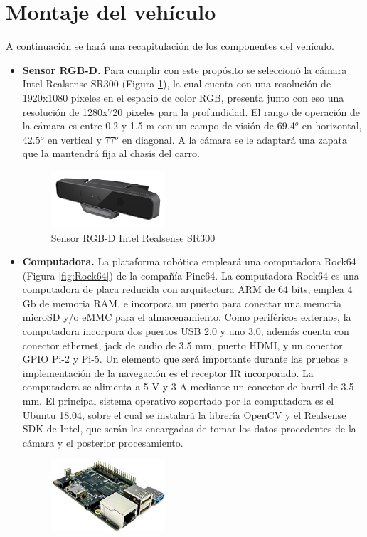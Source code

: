 \section{Montaje del vehículo}
\label{sec:monveh}
A continuación se hará una recapitulación de los componentes del vehículo.
\begin{itemize}
	\item {\bf Sensor RGB-D.} Para cumplir con este propósito se seleccionó la cámara Intel Realsense SR300 (Figura \ref{fig:SR300}), la cual cuenta con una resolución de 1920x1080 pixeles en el espacio de color RGB, presenta junto con eso una resolución de 1280x720 pixeles para la profundidad. El rango de operación de la cámara es entre 0.2 y 1.5 m con un campo de visión de 69.4$^o$ en horizontal, 42.5$^o$ en vertical y 77$^o$ en diagonal. A la cámara se le adaptará una zapata que la mantendrá fija al chasís del carro.
	\begin{figure}[htbp!]
		\centering
		\includegraphics[width=0.4\textwidth]{./Figuras/Intel}
		\caption{Sensor RGB-D Intel Realsense SR300}
		\label{fig:SR300}
	\end{figure}
	\item {\bf Computadora.} La plataforma robótica empleará una computadora Rock64 (Figura \ref{fig:Rock64}) de la compañía Pine64. La computadora Rock64 es una computadora de placa reducida con arquitectura ARM de 64 bits, emplea 4 Gb de memoria RAM, e incorpora un puerto para conectar una memoria microSD y/o eMMC para el almacenamiento. Como periféricos externos, la computadora incorpora dos puertos USB 2.0 y uno 3.0, además cuenta con conector ethernet, jack de audio de 3.5 mm, puerto HDMI, y un conector GPIO Pi-2 y Pi-5. Un elemento que será importante durante las pruebas e implementación de la navegación es el receptor IR incorporado. La computadora se alimenta a 5 V y 3 A mediante un conector de barril de 3.5 mm. El principal sistema operativo soportado por la computadora es el Ubuntu 18.04, sobre el cual se instalará la librería OpenCV y el Realsense SDK de Intel, que serán las encargadas de tomar los datos procedentes de la cámara y el posterior procesamiento.
	\begin{figure}[htbp!]
		\centering
		\includegraphics[width=0.4\textwidth]{./Figuras/Rock64}

\end{figure}
\end{itemize}
